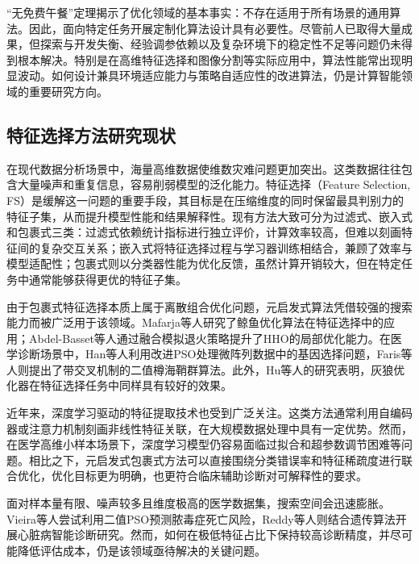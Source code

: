 “无免费午餐”定理揭示了优化领域的基本事实：不存在适用于所有场景的通用算法\cite{sbo_ref95}。因此，面向特定任务开展定制化算法设计具有必要性。尽管前人已取得大量成果，但探索与开发失衡、经验调参依赖以及复杂环境下的稳定性不足等问题仍未得到根本解决。特别是在高维特征选择和图像分割等实际应用中，算法性能常出现明显波动。如何设计兼具环境适应能力与策略自适应性的改进算法，仍是计算智能领域的重要研究方向。

\subsection{特征选择方法研究现状}

在现代数据分析场景中，海量高维数据使维数灾难问题更加突出。这类数据往往包含大量噪声和重复信息，容易削弱模型的泛化能力\cite{ibsa_ref17,ibsa_ref18}。特征选择（Feature Selection, FS）是缓解这一问题的重要手段，其目标是在压缩维度的同时保留最具判别力的特征子集，从而提升模型性能和结果解释性\cite{ibsa_ref50}。现有方法大致可分为过滤式、嵌入式和包裹式三类：过滤式依赖统计指标进行独立评价，计算效率较高，但难以刻画特征间的复杂交互关系\cite{ibsa_ref20}；嵌入式将特征选择过程与学习器训练相结合，兼顾了效率与模型适配性\cite{ibsa_ref21}；包裹式则以分类器性能为优化反馈，虽然计算开销较大，但在特定任务中通常能够获得更优的特征子集\cite{ibsa_ref23}。

由于包裹式特征选择本质上属于离散组合优化问题，元启发式算法凭借较强的搜索能力而被广泛用于该领域\cite{ibsa_ref95}。Mafarja等人\cite{ibsa_ref51}研究了鲸鱼优化算法在特征选择中的应用；Abdel-Basset等人\cite{ibsa_ref42}通过融合模拟退火策略提升了HHO的局部优化能力。在医学诊断场景中，Han等人\cite{ibsa_ref41}利用改进PSO处理微阵列数据中的基因选择问题，Faris等人\cite{ibsa_ref102}则提出了带交叉机制的二值樽海鞘群算法。此外，Hu等人\cite{ibsa_ref97}的研究表明，灰狼优化器在特征选择任务中同样具有较好的效果。

近年来，深度学习驱动的特征提取技术也受到广泛关注。这类方法通常利用自编码器或注意力机制刻画非线性特征关联，在大规模数据处理中具有一定优势\cite{fs_survey2023,dl_fs_review2024}。然而，在医学高维小样本场景下，深度学习模型仍容易面临过拟合和超参数调节困难等问题。相比之下，元启发式包裹式方法可以直接围绕分类错误率和特征稀疏度进行联合优化，优化目标更为明确，也更符合临床辅助诊断对可解释性的要求\cite{ibsa_ref95,deepq_meta_fs2024}。

面对样本量有限、噪声较多且维度极高的医学数据集\cite{ibsa_ref7}，搜索空间会迅速膨胀。Vieira等人\cite{sbo_ref73}尝试利用二值PSO预测脓毒症死亡风险，Reddy等人\cite{ibsa_ref49}则结合遗传算法开展心脏病智能诊断研究。然而，如何在极低特征占比下保持较高诊断精度，并尽可能降低评估成本，仍是该领域亟待解决的关键问题。

